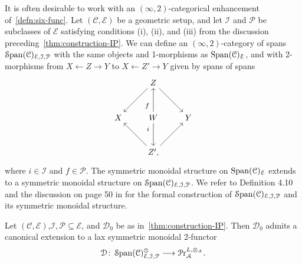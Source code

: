 \medskip

It is often desirable to work with an $(\infty ,2)$-categorical enhancement of~\cref{defn:six-func}. Let $(\mathcal C,\mathcal E)$ be a geometric setup, and let $\mathcal I$ and $\mathcal P$ be subclasses of $\mathcal E$ satisfying conditions (i), (ii), and (iii) from the discussion preceding~\cref{thm:construction-IP}.
We can define an $(\infty ,2)$-category of spans $\operatorname{\mathcal S\mathrm{pan}}({\mathcal C})_{\mathcal E,\mathcal I,\mathcal P}$ with the same objects and 1-morphisms as $\operatorname{\mathrm{Span}}({\mathcal C})_{\mathcal E}$, and with 2-morphisms from $X\leftarrow Z\to Y$ to  $X\leftarrow Z'\to Y$ given by spans of spans
\[
  \begin{tikzpicture}[baseline=(current bounding box.center)]
    \node (X) at (-1.5,0){$X$};
    \node (Z) at (0,1.5){$Z$};
    \node (Zprime) at (0,-1.5){$Z',$};
    \node (W) at (0,0){$W$};
    \node (Y) at (1.5,0){$Y$};

    \draw (Z) edge[->] (Y);
    \draw (Z) edge[->] (X);
    \draw (Zprime) edge[->] (Y);
    \draw (Zprime) edge[->] (X);
    \draw (W) edge[->] node[near start,left=1.5pt]{{\footnotesize $f$}}(Z);
    \draw (W) edge[->] node[near start,left=1.5pt]{{\footnotesize $i$}}(Zprime);
  \end{tikzpicture}
\]
where $i\in\mathcal I$ and $f\in\mathcal P$. The symmetric monoidal structure on $\operatorname{\mathrm{Span}}({\mathcal C})_{\mathcal E}$ extends to a symmetric monoidal structure on $\operatorname{\mathcal S\mathrm{pan}}({\mathcal C})_{\mathcal E,\mathcal I,\mathcal P}$. We refer to Definition 4.10 and the discussion on page 50 in \cite{Cnossen_Lenz_Linskens2026} for the formal construction of  $\operatorname{\mathcal S\mathrm{pan}}({\mathcal C})_{\mathcal E,\mathcal I,\mathcal P}$ and its symmetric monoidal structure.
\begin{thm}
  Let $(\mathcal C,\mathcal E)$,$\mathcal I,\mathcal P\subseteq\mathcal E$, and $\mathcal D_0$ be as in~\cref{thm:construction-IP}. Then $\mathcal D_0$ admits a canonical extension to a lax symmetric monoidal 2-functor
  \[
    \mathcal D\colon\operatorname{\mathcal S\mathrm{pan}}({\mathcal C})_{\mathcal E,\mathcal I,\mathcal P}^{\otimes}\longrightarrow\mathcal P\mathrm r_{\mathcal A}^{L,\otimes_{\mathcal A}}.
  \]
\end{thm}


